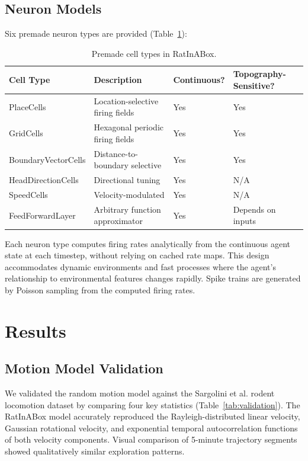 \documentclass[12pt]{article}
\begin{document}
\subsection{Neuron Models}

Six premade neuron types are provided (Table~\ref{tab:cell_types}):

\begin{table}[htbp]
\centering
\caption{Premade cell types in RatInABox.}
\label{tab:cell_types}
\begin{tabular}{llll}
\toprule
Cell Type & Description & Continuous? & Topography-Sensitive? \\
\midrule
PlaceCells & Location-selective firing fields & Yes & Yes \\
GridCells & Hexagonal periodic firing fields & Yes & Yes \\
BoundaryVectorCells & Distance-to-boundary selective & Yes & Yes \\
HeadDirectionCells & Directional tuning & Yes & N/A \\
SpeedCells & Velocity-modulated & Yes & N/A \\
FeedForwardLayer & Arbitrary function approximator & Yes & Depends on inputs \\
\bottomrule
\end{tabular}
\end{table}

Each neuron type computes firing rates analytically from the continuous agent state at each timestep, without relying on cached rate maps. This design accommodates dynamic environments and fast processes where the agent's relationship to environmental features changes rapidly. Spike trains are generated by Poisson sampling from the computed firing rates.

\section{Results}

\subsection{Motion Model Validation}

We validated the random motion model against the Sargolini et al. \citep{sargolini2006conjunctive} rodent locomotion dataset by comparing four key statistics (Table~\ref{tab:validation}). The RatInABox model accurately reproduced the Rayleigh-distributed linear velocity, Gaussian rotational velocity, and exponential temporal autocorrelation functions of both velocity components. Visual comparison of 5-minute trajectory segments showed qualitatively similar exploration patterns.
\end{document}
